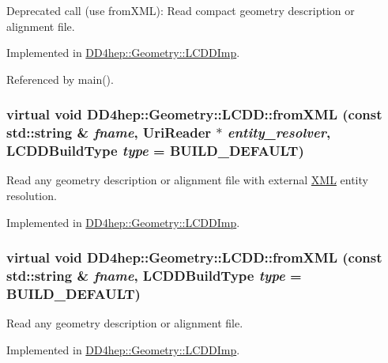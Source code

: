 Deprecated call (use fromXML): Read compact geometry description or alignment file. 

Implemented in \hyperlink{class_d_d4hep_1_1_geometry_1_1_l_c_d_d_imp_a4eb2edfae225abead99a6cd6a85e84f7}{DD4hep::Geometry::LCDDImp}.

Referenced by main().\hypertarget{class_d_d4hep_1_1_geometry_1_1_l_c_d_d_aab90efbd334c08ee8a06b0f97d219243}{
\subsubsection[{fromXML}]{\setlength{\rightskip}{0pt plus 5cm}virtual void DD4hep::Geometry::LCDD::fromXML (const std::string \& {\em fname}, \/  {\bf UriReader} $\ast$ {\em entity\_\-resolver}, \/  {\bf LCDDBuildType} {\em type} = {\ttfamily BUILD\_\-DEFAULT})}}
\label{class_d_d4hep_1_1_geometry_1_1_l_c_d_d_aab90efbd334c08ee8a06b0f97d219243}


Read any geometry description or alignment file with external \hyperlink{namespace_d_d4hep_1_1_x_m_l}{XML} entity resolution. 

Implemented in \hyperlink{class_d_d4hep_1_1_geometry_1_1_l_c_d_d_imp_ae1c435032cd33235cd6405ca8d8aae9b}{DD4hep::Geometry::LCDDImp}.\hypertarget{class_d_d4hep_1_1_geometry_1_1_l_c_d_d_ad6e8de7ab4f0374cea7e3e15e33af66e}{
\subsubsection[{fromXML}]{\setlength{\rightskip}{0pt plus 5cm}virtual void DD4hep::Geometry::LCDD::fromXML (const std::string \& {\em fname}, \/  {\bf LCDDBuildType} {\em type} = {\ttfamily BUILD\_\-DEFAULT})}}
\label{class_d_d4hep_1_1_geometry_1_1_l_c_d_d_ad6e8de7ab4f0374cea7e3e15e33af66e}


Read any geometry description or alignment file. 

Implemented in \hyperlink{class_d_d4hep_1_1_geometry_1_1_l_c_d_d_imp_a23921e95e2ba300135d635e58ecb0c51}{DD4hep::Geometry::LCDDImp}.

